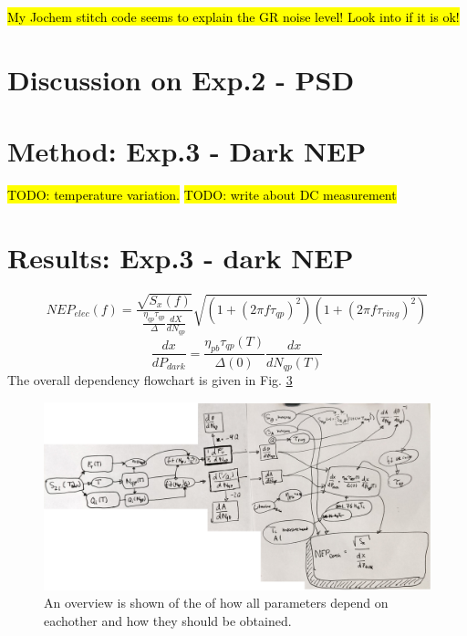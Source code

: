 \hl{My Jochem stitch code seems to explain the GR noise level! Look into if it is ok!}
\section{Discussion on Exp.2 - PSD}


\section{Method: Exp.3 - Dark NEP}
\hl{TODO: temperature variation.}
\hl{TODO: write about DC measurement}

\section{Results: Exp.3 - dark NEP}

\begin{equation}
    NEP_{elec}(f) = \frac{\sqrt{S_{x}(f)}}{\frac{\eta_{qp}\tau_{qp}}{\Delta} \frac{dX}{dN_{qp}}} \sqrt{(1+(2\pi f \tau_{qp})^{2})(1+(2\pi f \tau_{ring})^{2})} 
    \label{eq:ch3_elecNEPdef}
\end{equation}
\begin{equation}
    \frac{dx}{dP_{dark}} = \frac{\eta_{pb}\tau_{qp} (T)}{\Delta(0)}\frac{dx}{dN_{qp}(T)}
    \label{eq:ch3_res_dark}
\end{equation}
The overall dependency flowchart is given in Fig. \ref{}
\begin{figure}[ht]
	\centering
	\includegraphics[width=.80\linewidth]{figures/ch5_measurement/Overview_Process.jpg}
	\caption{An overview is shown of the of how all parameters depend on eachother and how they should be obtained.}
	\label{fig:NEP_flow_diagram}
\end{figure}



